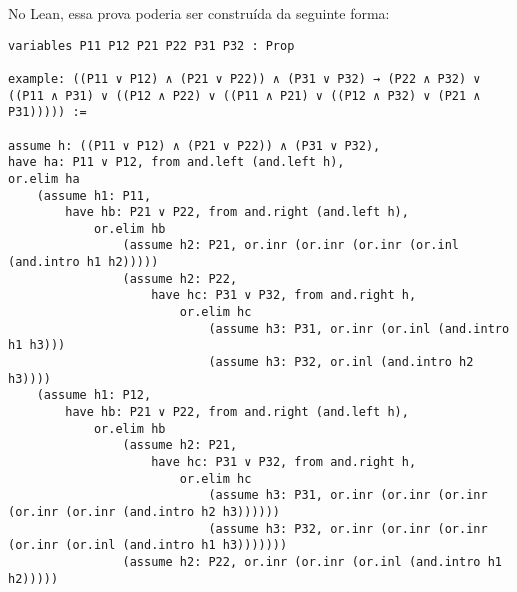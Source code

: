 No Lean, essa prova poderia ser construída da seguinte forma: 
\begin{lstlisting}
variables P11 P12 P21 P22 P31 P32 : Prop

example: ((P11 ∨ P12) ∧ (P21 ∨ P22)) ∧ (P31 ∨ P32) → (P22 ∧ P32) ∨ ((P11 ∧ P31) ∨ ((P12 ∧ P22) ∨ ((P11 ∧ P21) ∨ ((P12 ∧ P32) ∨ (P21 ∧ P31))))) :=

assume h: ((P11 ∨ P12) ∧ (P21 ∨ P22)) ∧ (P31 ∨ P32),
have ha: P11 ∨ P12, from and.left (and.left h),
or.elim ha
    (assume h1: P11, 
        have hb: P21 ∨ P22, from and.right (and.left h),
            or.elim hb
                (assume h2: P21, or.inr (or.inr (or.inr (or.inl (and.intro h1 h2)))))
                (assume h2: P22, 
                    have hc: P31 ∨ P32, from and.right h,
                        or.elim hc
                            (assume h3: P31, or.inr (or.inl (and.intro h1 h3)))
                            (assume h3: P32, or.inl (and.intro h2 h3))))
    (assume h1: P12, 
        have hb: P21 ∨ P22, from and.right (and.left h),
            or.elim hb
                (assume h2: P21, 
                    have hc: P31 ∨ P32, from and.right h,
                        or.elim hc
                            (assume h3: P31, or.inr (or.inr (or.inr (or.inr (or.inr (and.intro h2 h3))))))
                            (assume h3: P32, or.inr (or.inr (or.inr (or.inr (or.inl (and.intro h1 h3)))))))
                (assume h2: P22, or.inr (or.inr (or.inl (and.intro h1 h2)))))
\end{lstlisting}

